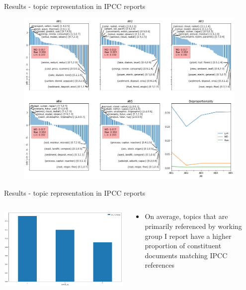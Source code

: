 \documentclass[9pt]{beamer}
\begin{document}
\begin{frame}{Results - topic representation in IPCC reports}

	\begin{figure}
			\includegraphics[width=0.8\linewidth]{../plots/ipcc_representation/ipcc_rep_662_ARs}
	\end{figure}

\end{frame}

\begin{frame}{Results - topic representation in IPCC reports}

\begin{columns}
	\begin{column}{0.7\linewidth}
				\includegraphics[width=\linewidth]{../plots/ipcc_coverage_by_wg_654.png}
	\end{column}
	\begin{column}{0.3\linewidth}
		\begin{itemize}
			\item On average, topics that are primarily referenced by working group I report have a higher proportion of constituent documents matching IPCC references
		\end{itemize}
	\end{column}
\end{columns}

	
	
\end{frame}
\end{document}
